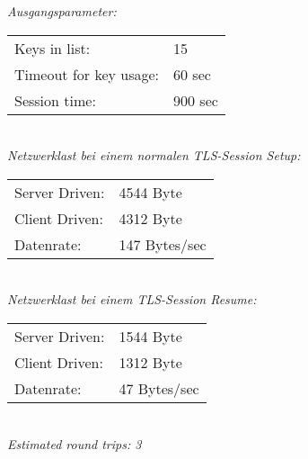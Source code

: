 \emph{Ausgangsparameter:}

\begin{tabular}{ll}
Keys in list: & 15\tabularnewline
Timeout for key usage: & 60 sec\tabularnewline
Session time: & 900 sec\tabularnewline
\end{tabular}\\
\emph{Netzwerklast bei einem normalen TLS-Session Setup:}

\begin{tabular}{ll}
Server Driven: & 4544 Byte\tabularnewline
Client Driven: & 4312 Byte\tabularnewline
Datenrate:\footnotemark & 147 Bytes/sec\tabularnewline
\end{tabular}\\
\emph{Netzwerklast bei einem TLS-Session Resume:}

\begin{tabular}{ll}
Server Driven: & 1544 Byte\tabularnewline
Client Driven: & 1312 Byte\tabularnewline
Datenrate: & 47 Bytes/sec\tabularnewline
\end{tabular}\\
\emph{Estimated round trips:	3}
